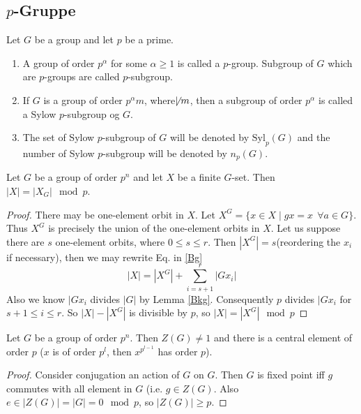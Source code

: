 \subsection{\(p\)-Gruppe}
\begin{definition}[\(p\)-group]
    Let \(G\) be a group and let \(p\) be a prime.
    \begin{enumerate}
        \item A group of order \(p^\alpha\) for some \(\alpha \geq 1\) is called a \(p\)-group. Subgroup of \(G\) which are \(p\)-groups are called \(p\)-subgroup.
        \item If \(G\) is a group of order \(p^\alpha m\), where\(\not\mid m\), then a subgroup of order \(p^\alpha\) is called a Sylow \(p\)-subgroup og \(G\).
        \item The set of Sylow \(p\)-subgroup of \(G\) will be denoted by \(\mathrm{Syl}_p(G)\) and the number of Sylow \(p\)-subgroup will be denoted by \(n_p(G)\). 
    \end{enumerate}
\end{definition}

\begin{lemma}
    Let \(G\) be a group of order \(p^n\) and let \(X\) be a finite \(G\)-set. Then \(|X| =|X_G|\mod p\).
\end{lemma}
\begin{proof}
    There may be one-element orbit in \(X\). Let \(X^G = \{x\in X\mid gx = x\ \ \forall a\in G\}\). Thus \(X^G\) is precisely the union of the one-element orbits in \(X\). Let us suppose there are \(s\) one-element orbits, where \(0\leq s\leq r\). Then \(|X^G| = s\)(reordering the \(x_i\) if necessary), then we may rewrite Eq. in \ref{Bg}\[|X| = |X^G| + \sum_{i = s+1}^r |G{x_i}|\]
    Also we know \(|Gx_i\) divides \(|G|\) by Lemma \ref{Bkg}. Consequently \(p\) divides \(|Gx_i\) for \(s+1\leq i \leq r\). So \(|X|-|X^G|\) is divisible by \(p\), so \(|X|=|X^G|\mod p\)
\end{proof}

\begin{theorem}\label{centerbig}
    Let \(G\) be a group of order \(p^n\). Then \(Z(G) \not =1\) and there is a central element of order \(p\) (\(x\) is of order \(p^l\), then \(x^{p^{l-1}}\) has order \(p\)).
\end{theorem}
\begin{proof}
    Consider conjugation an action of \(G\) on \(G\). Then \(G\) is fixed point iff \(g\) commutes with all element in \(G\) (i.e. \(g\in Z(G)\). Also \(e\in |Z(G)| = |G| = 0 \mod p \), so \(|Z(G)| \geq p\). 
\end{proof}

